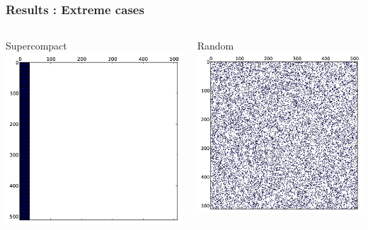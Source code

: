 \documentclass{beamer}
\begin{document}
\begin{frame}
  \frametitle{Results : Extreme cases}
  \begin{columns}
    
    \begin{block}{Supercompact}
      \centering
      \includegraphics[width=.6\linewidth]{slides-figures/ICS-figures/supercompact_matrix-crop.png}
    \end{block}
  
    \begin{block}{Random}
      \centering
      \includegraphics[width=.6\linewidth]{slides-figures/ICS-figures/random_matrix-crop.png}
    \end{block}
    

\end{columns}
\end{frame}
\end{document}
